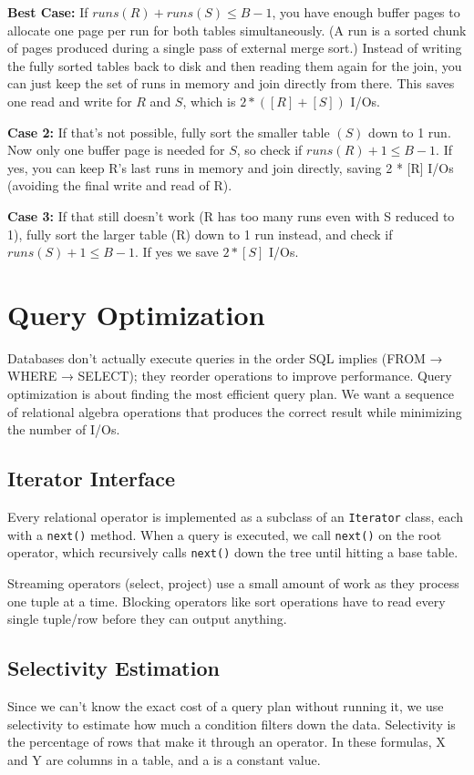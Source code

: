\documentclass{article}
\begin{document}
\textbf{Best Case:} If $runs(R) + runs(S) \leq B - 1$, you have enough buffer pages to allocate one page per run for both tables simultaneously. (A run is a sorted chunk of pages produced during a single pass of external merge sort.) Instead of writing the fully sorted tables back to disk and then reading them again for the join, you can just keep the set of runs in memory and join directly from there. This saves one read and write for $R$ and $S$, which is $2*([R] + [S])$ I/Os.

\textbf{Case 2:} If that's not possible, fully sort the smaller table $(S)$ down to 1 run. Now only one buffer page is needed for $S$, so check if $runs(R) + 1 \leq B - 1.$ If yes, you can keep R's last runs in memory and join directly, saving 2 * [R] I/Os (avoiding the final write and read of R).

\textbf{Case 3:} If that still doesn't work (R has too many runs even with S reduced to 1), fully sort the larger table (R) down to 1 run instead, and check if $runs(S) + 1 \leq B-1$. If yes we save $2*[S]$ I/Os.

\section{Query Optimization}
Databases don't actually execute queries in the order SQL implies (FROM → WHERE → SELECT); they reorder operations to improve performance. Query optimization is about finding the most efficient query plan. We want a sequence of relational algebra operations that produces the correct result while minimizing the number of I/Os. 


\subsection{Iterator Interface}
Every relational operator is implemented as a subclass of an \texttt{Iterator} class, each with a \texttt{next()} method. When a query is executed, we call \texttt{next()} on the root operator, which recursively calls \texttt{next()} down the tree until hitting a base table. 

Streaming operators (select, project) use a small amount of work as they process one tuple at a time. Blocking operators like sort operations have to read every single tuple/row before they can output anything.

\subsection{Selectivity Estimation}
Since we can't know the exact cost of a query plan without running it, we use selectivity to estimate how much a condition filters down the data. Selectivity is the percentage of rows that make it through an operator. In these formulas, X and Y are columns in a table, and a is a constant value. 
\end{document}
